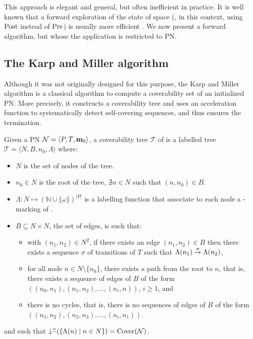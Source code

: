 This approach is elegant and general, but often inefficient in practice.
It is well known that a forward exploration of the state of space (, in this context, using $\operatorname{Post}$ instead of $\operatorname{Pre}$) is usually more efficient .
We now present a forward algorithm, but whose the application is restricted to \ac{PN}.

\subsection{The Karp and Miller algorithm}

Although it was not originally designed for this purpose, the Karp and Miller algorithm \cite{Karp69} is a classical algorithm to compute a coverability set of an initialized \ac{PN}.
More precisely, it constructs a coverability tree and uses an acceleration function to systematically detect self-covering sequences, and thus ensures the termination.

\begin{defi}
  Given a \ac{PN} $\mathcal{N} = \langle P,T, \mathbf{m}_0\rangle$, a coverability tree $\mathcal{T}$ of \tupleN is a labelled tree $\mathcal{T} = \langle N, B, n_0, \Lambda\rangle$ where:
  \begin{itemize}
    \item $N$ is the set of nodes of the tree.%
    \item $n_0 \in N$ is the root of the tree,  $\nexists n \in N$ such that $(n, n_0) \in B$.
    \item $\Lambda : N \mapsto (\mathbb{N} \cup \{\omega\})^{|P|}$ is a labelling function that associate to each node a \textomega-marking of \tupleN.
    \item $B \subseteq N \times N$, the set of edges, is such that:
      \begin{itemize}
        \item with $(n_1, n_2) \in N^2$, if there exists an edge $(n_1, n_2) \in B$ then there exists a sequence $\sigma$ of transitions of $T$ such that $\Lambda(n_1) \stackrel{\sigma}{\to} \Lambda(n_2)$,
        \item for all node $n \in N \setminus \{n_0\}$, there exists a path from the root to $n$, that is, there exists a sequence of edges of $B$ of the form $((n_0, n_1), (n_1, n_2), \dots, (n_{i}, n))$, $i \geq 1$, and
        \item there is no cycles, that is, there is no sequences of edges of $B$ of the form $((n_1, n_2), (n_2, n_3), \dots, (n_i, n_1))$.
      \end{itemize}
  \end{itemize}
  and such that $\operatorname{\downarrow^\preceq}(\{\Lambda(n) \mid n \in N\}) = \operatorname{Cover}(\mathcal{N})$.
\end{defi}

